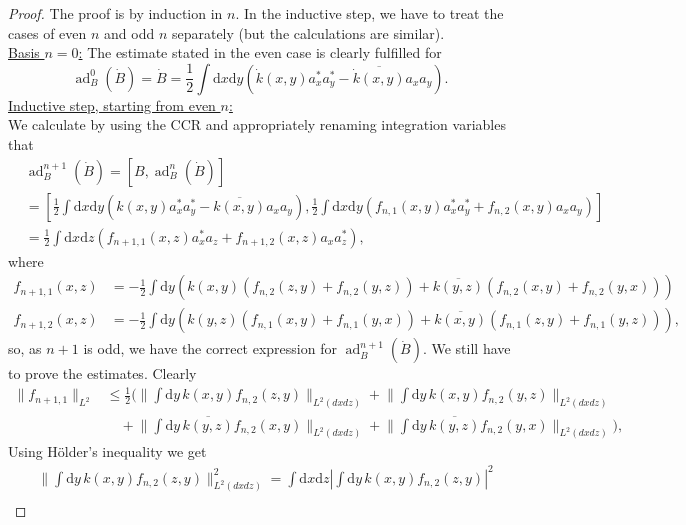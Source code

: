 \documentclass[11pt,a4paper,DIV11]{scrartcl}	%
\newcommand{\ad}{\operatorname{ad}}	%
\newcommand{\di}{\textrm{d}}		%
\newcommand{\cc}[1]{\overline{#1}}	%
\newcommand{\norm}[1]{\lVert#1\rVert}	%
\newcommand{\be}[1]{\begin{equation}\label{eq:#1}}	%
\newcommand{\ee}{\end{equation}}
\newcommand{\bd}{\begin{displaymath}}			%
\newcommand{\ed}{\end{displaymath}}
\begin{document}
\begin{proof} The proof is by induction in $n$. In the inductive step, we have to treat the cases of even $n$ and odd $n$ separately (but the calculations are similar).\\
\underline{Basis $n=0$:} The estimate stated in the even case is clearly fulfilled for
\bd
\ad^0_B(\dot B) = \dot B = \frac{1}{2}\int \di x\di y\left( \dot k(x,y) a^\ast_x a^\ast_y - \cc{\dot k(x,y)} a_x a_y \right).
\ed
\underline{Inductive step, starting from even $n$:}\\
We calculate by using the CCR and appropriately renaming integration variables that
\begin{align*}
& \ad^{n+1}_B(\dot B) = [B,\ad^n_B(\dot B)] \\
& = \left[\frac{1}{2} \int \di x\di y\left( k(x,y)a^\ast_x a^\ast_y - \cc{k(x,y)}a_x a_y \right), \frac{1}{2}\int \di x\di y\left( f_{n,1}(x,y) a^\ast_x a^\ast_y + f_{n,2}(x,y) a_x a_y \right)\right] \\
& = \frac{1}{2} \int \di x\di z \left(f_{n+1,1}(x,z) a^\ast_x a_z + f_{n+1,2}(x,z) a_x a^\ast_z \right),
\end{align*}
where
\begin{equation}
\label{eq:even}
\begin{split}
f_{n+1,1}(x,z) & = -\frac{1}{2} \int \di y \left( k(x,y) \left( f_{n,2}(z,y) + f_{n,2}(y,z) \right) + \cc{k(y,z)}\left( f_{n,2}(x,y) + f_{n,2}(y,x)\right) \right)\\
f_{n+1,2}(x,z) & = -\frac{1}{2} \int \di y \left( k(y,z) \left( f_{n,1}(x,y) + f_{n,1}(y,x) \right) + \cc{k(x,y)}\left( f_{n,1}(z,y) + f_{n,1}(y,z)\right) \right), 
\end{split}
\end{equation}
so, as $n+1$ is odd, we have the correct expression for $\ad^{n+1}_B(\dot
B)$. We still have to prove the estimates. Clearly
\be{normnorm}
\begin{split}
\norm{f_{n+1,1}}_{L^2} & \leq \frac{1}{2} \bigg( \norm{\int \di y\, k(x,y) f_{n,2}(z,y)}_{L^2(dxdz)} + \norm{\int \di y\, k(x,y) f_{n,2}(y,z)}_{L^2(dxdz)} \\
& \quad + \norm{\int \di y\, \cc{k(y,z)}f_{n,2}(x,y)}_{L^2(dxdz)} + \norm{\int \di y\, \cc{k(y,z)} f_{n,2}(y,x)}_{L^2(dxdz)} \bigg),
\end{split}
\ee
Using H\"older's inequality we get
\begin{align*}
& \norm{\int \di y\,k(x,y) f_{n,2}(z,y)}^2_{L^2(dxdz)} = \int \di x\di z \left\lvert \int \di y\,k(x,y) f_{n,2}(z,y) \right\rvert^2 \\

\end{align*}
\end{proof}
\end{document}
